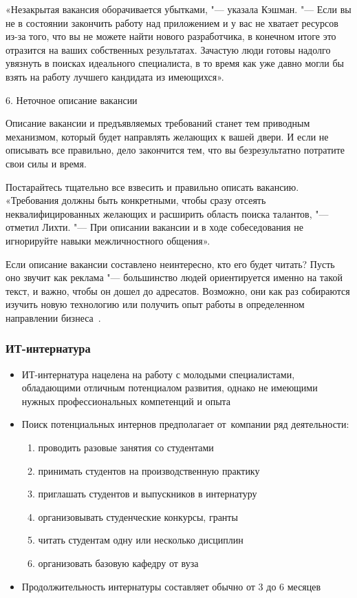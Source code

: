 \documentclass{../industrial-development}
\begin{document}
«Незакрытая вакансия оборачивается убытками, "--- указала Кэшман. "--- Если вы не в состоянии закончить работу над приложением и у вас не хватает ресурсов из-за того, что вы не можете найти нового разработчика, в конечном итоге это отразится на ваших собственных результатах. Зачастую люди готовы надолго увязнуть в поисках идеального специалиста, в то время как уже давно могли бы взять на работу лучшего кандидата из имеющихся».

6. \alert{Неточное описание вакансии}

Описание вакансии и предъявляемых требований станет тем приводным механизмом, который будет направлять желающих к вашей двери. И если не описывать все правильно, дело закончится тем, что вы безрезультатно потратите свои силы и время.

Постарайтесь тщательно все взвесить и правильно описать вакансию. «Требования должны быть конкретными, чтобы сразу отсеять неквалифицированных желающих и рас­ширить область поиска талантов, "--- отметил Лихти. "--- При описании вакансии и в ходе собеседования не игнорируйте навыки межличностного общения».

Если описание вакансии составлено неинтересно, кто его будет читать? Пусть оно звучит как реклама "--- большинство людей ориентируется именно на такой текст, и важно, чтобы он дошел до адресатов. Возможно, они как раз собираются изучить новую технологию или получить опыт работы в определенном направлении бизнеса~\cite{RichHein}.

\begin{frame} \frametitle{ИТ-интернатура}
  \begin{itemize}
		\item ИТ-интернатура нацелена на работу с молодыми специалистами, обладающими отличным потенциалом развития, однако не имеющими нужных профессиональных компетенций и опыта
		\item Поиск потенциальных интернов предполагает от~компании ряд деятельности:
  \begin{enumerate}
\item проводить разовые занятия со студентами
\item	принимать студентов на производственную практику
\item	приглашать студентов и выпускников в интернатуру
\item	организовывать студенческие конкурсы, гранты
\item	читать студентам одну или несколько дисциплин
\item	организовать базовую кафедру от вуза
	  \end{enumerate}
	\item Продолжительность интернатуры составляет обычно от 3 до 6 месяцев
  \end{itemize}
\end{frame}
\end{document}
